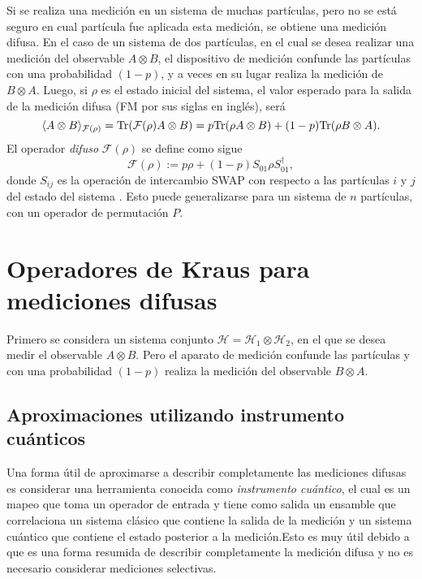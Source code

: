 Si se  realiza una  medición en un sistema de muchas partículas, pero no se
está seguro en cual partícula  fue aplicada esta medición, se obtiene una
medición difusa. En el caso de un sistema de dos partículas, en el cual se
desea realizar una medición del observable $A\otimes B$, el dispositivo de
medición confunde las partículas con una probabilidad $(1-p)$, y a veces en su
lugar realiza la medición de $B\otimes A$. Luego, si $\rho$ es el estado
inicial del sistema, el valor esperado para la salida de la medición difusa (FM
por sus siglas en inglés), será 
\begin{equation}
    \langle A\otimes B\rangle_{\mathcal{F}(\rho)}={\rm Tr}(\mathcal{F}(\rho)A\otimes B)=p{\rm Tr}(\rho A\otimes B)+(1-p){\rm Tr}(\rho B\otimes A).
\end{equation}
El operador \textit{difuso }$\mathcal{F}(\rho)$ se define como sigue 
\begin{equation}\label{operador_difuso}
    \mathcal{F}(\rho):=p\rho+(1-p)S_{01}\rho S_{01}^\dagger,
\end{equation}
donde $S_{ij}$ es la operación de intercambio SWAP con respecto a las
partículas $i$ y $j$ del estado del sistema {\cite{Pineda_2021}}. Esto puede
generalizarse para un sistema de $n$ partículas, con un operador de permutación
$P$.

 \section{Operadores de Kraus para mediciones difusas} %

 Primero se considera un sistema conjunto $\mathcal{H}=\mathcal{H}_1\otimes
\mathcal{H}_2$, en el que se desea medir el observable $A\otimes B$. Pero el
aparato de medición confunde las partículas y con una probabilidad $(1-p) $
realiza la medición del observable $B\otimes A$. 

   
\subsection{Aproximaciones utilizando instrumento cuánticos} %

Una forma útil de aproximarse a describir completamente las mediciones difusas
es considerar una herramienta conocida como \textit{instrumento cuántico}, el
cual es un mapeo que toma un operador de entrada y tiene como salida un
ensamble que correlaciona un sistema clásico que contiene la salida de la
medición y un sistema cuántico que contiene el estado posterior a la medición.Esto es muy útil debido a que es una forma resumida
de describir completamente la medición difusa y no es necesario considerar
mediciones selectivas. 


